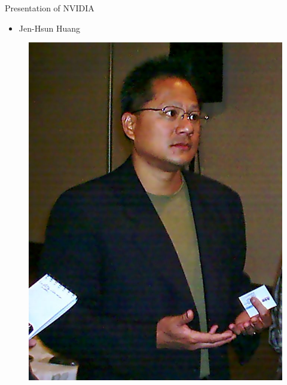 \documentclass{beamer}
\begin{document}
\begin{frame}{Presentation of NVIDIA}
	\transdissolve[duration=0.08]
	\begin{block}{}
		\begin{itemize}
			\item<+->{Jen-Hsun Huang}
		\end{itemize}
	\end{block}
	\begin{figure}[h]
		\includegraphics[width=0.50\textheight]{images/JensenHuang.jpg}
	\end{figure}
\end{frame}
\end{document}
